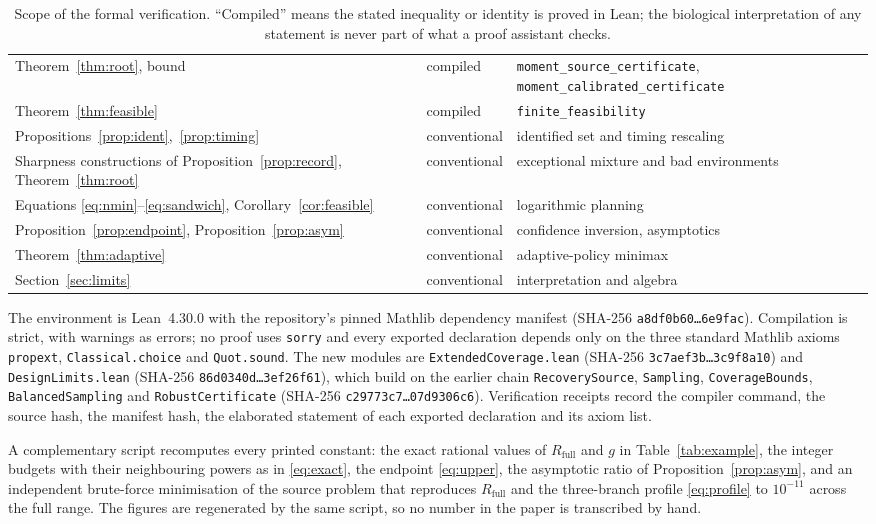 \documentclass[11pt]{article}
\theoremstyle{definition}
\theoremstyle{remark}
\newcommand{\Rfull}{R_{\mathrm{full}}}
\newcommand{\leanref}[1]{\texttt{#1}}
\begin{document}
\begin{table}[ht]
\begin{tabularx}{\linewidth}{@{}>{\raggedright\arraybackslash}p{4.4cm} l Y@{}}
Theorem~\ref{thm:root}, bound & compiled & \leanref{moment\_\allowbreak{}source\_\allowbreak{}certificate},
\leanref{moment\_\allowbreak{}calibrated\_\allowbreak{}certificate}\\
Theorem~\ref{thm:feasible} & compiled & \leanref{finite\_\allowbreak{}feasibility}\\
\midrule
Propositions~\ref{prop:ident},~\ref{prop:timing} & conventional &
identified set and timing rescaling\\
Sharpness constructions of
Proposition~\ref{prop:record}, Theorem~\ref{thm:root} & conventional &
exceptional mixture and bad environments\\
Equations \eqref{eq:nmin}--\eqref{eq:sandwich},
Corollary~\ref{cor:feasible} & conventional & logarithmic planning\\
Proposition~\ref{prop:endpoint}, Proposition~\ref{prop:asym} & conventional &
confidence inversion, asymptotics\\
Theorem~\ref{thm:adaptive} & conventional & adaptive-policy minimax\\
Section~\ref{sec:limits} & conventional & interpretation and algebra\\
\bottomrule
\end{tabularx}
\caption{Scope of the formal verification. ``Compiled'' means the stated
inequality or identity is proved in Lean; the biological interpretation of any
statement is never part of what a proof assistant checks.}
\label{tab:formal}
\end{table}

The environment is Lean~4.30.0 with the repository's pinned Mathlib dependency
manifest (SHA-256 \texttt{a8df0b60\ldots6e9fac}). Compilation is strict, with
warnings as errors; no proof uses \texttt{sorry} and every exported declaration
depends only on the three standard Mathlib axioms \texttt{propext},
\texttt{Classical.choice} and \texttt{Quot.sound}. The new modules are
\texttt{ExtendedCoverage.lean} (SHA-256 \texttt{3c7aef3b\ldots3c9f8a10}) and
\texttt{DesignLimits.lean} (SHA-256 \texttt{86d0340d\ldots3ef26f61}), which build
on the earlier chain \texttt{RecoverySource}, \texttt{Sampling},
\texttt{CoverageBounds}, \texttt{BalancedSampling} and \texttt{RobustCertificate}
(SHA-256 \texttt{c29773c7\ldots07d9306c6}). Verification receipts record the
compiler command, the source hash, the manifest hash, the elaborated statement
of each exported declaration and its axiom list.

A complementary script recomputes every printed constant: the exact rational
values of $\Rfull$ and $g$ in Table~\ref{tab:example}, the integer budgets with
their neighbouring powers as in \eqref{eq:exact}, the endpoint
\eqref{eq:upper}, the asymptotic ratio of Proposition~\ref{prop:asym}, and an
independent brute-force minimisation of the source problem that reproduces
$\Rfull$ and the three-branch profile \eqref{eq:profile} to $10^{-11}$ across the
full range. The figures are regenerated by the same script, so no number in the
paper is transcribed by hand.
\end{document}
